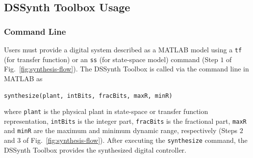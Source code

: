 \documentclass[conference]{IEEEtran}
\newcommand\tool{{DSSynth Toolbox}\xspace}
\begin{document}
%
%
%
%
%

\subsection{\tool Usage}

\subsubsection{Command Line}

Users must provide a digital system described as a MATLAB model using a
\texttt{tf} (for transfer function) or an \texttt{ss} (for state-space
model) command (Step $1$ of Fig.~\ref{fig:synthesis-flow}).  The \tool is
called via the command line in MATLAB as

\begin{center} 
\texttt{synthesize(plant, intBits, fracBits, maxR, minR)}
\end{center} 

\noindent where \texttt{plant} is the physical plant in state-space or
transfer function representation, \texttt{intBits} is the integer part,
\texttt{fracBits} is the fractional part, \texttt{maxR} and \texttt{minR}
are the maximum and minimum dynamic range, respectively (Steps $2$ and
$3$ of Fig.~\ref{fig:synthesis-flow}).
%
After executing the \texttt{synthesize} command, the \tool provides the
synthesized digital controller.

\end{document}
